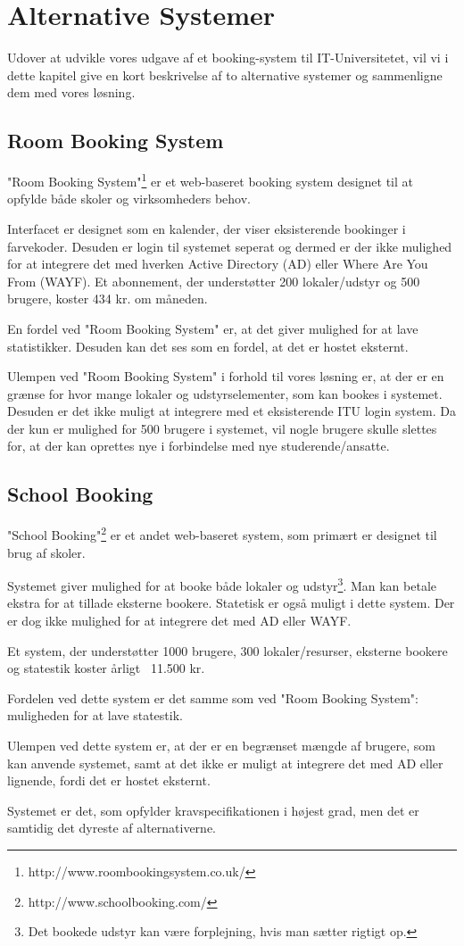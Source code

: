 \chapter{Alternative Systemer}
\label{Comparison}
Udover at udvikle vores udgave af et booking-system til IT-Universitetet, vil vi i dette kapitel give en kort beskrivelse af to alternative  systemer og sammenligne dem med vores løsning.

\section{Room Booking System}
\label{Comparison_RBS}
"Room Booking System"\footnote{http://www.roombookingsystem.co.uk/} er et web-baseret booking system designet til at opfylde både skoler og virksomheders behov. 

Interfacet er designet som en kalender, der viser eksisterende bookinger i farvekoder. Desuden er login til systemet seperat og dermed er der ikke mulighed for at integrere det med hverken Active Directory (AD) eller Where Are You From (WAYF). Et abonnement, der understøtter 200 lokaler/udstyr og 500 brugere, koster 434 kr. om måneden.

En fordel ved "Room Booking System" er, at det giver mulighed for at lave statistikker. Desuden kan det ses som en fordel, at det er hostet eksternt.

Ulempen ved "Room Booking System" i forhold til vores løsning er, at der er en grænse for hvor mange lokaler og udstyrselementer, som kan bookes i systemet. Desuden er det ikke muligt at integrere med et eksisterende ITU login system. Da der kun er mulighed for 500 brugere i systemet, vil nogle brugere skulle slettes for, at der kan oprettes nye i forbindelse med nye studerende/ansatte.

\section{School Booking}
\label{Comparison_SB}
"School Booking"\footnote{http://www.schoolbooking.com/} er et andet web-baseret system, som primært er designet til brug af skoler. 

Systemet giver mulighed for at booke både lokaler og udstyr\footnote{Det bookede udstyr kan være forplejning, hvis man sætter rigtigt op.}. Man kan betale ekstra for at tillade eksterne bookere. Statetisk er også muligt i dette system. Der er dog ikke mulighed for at integrere det med AD eller WAYF.

Et system, der understøtter 1000 brugere, 300 lokaler/resurser, eksterne bookere og statestik koster årligt ~11.500 kr.

Fordelen ved dette system er det samme som ved "Room Booking System": muligheden for at lave statestik.

Ulempen ved dette system er, at der er en begrænset mængde af brugere, som kan anvende systemet, samt at det ikke er muligt at integrere det med AD eller lignende, fordi det er hostet eksternt.

Systemet er det, som opfylder kravspecifikationen i højest grad, men det er samtidig det dyreste af alternativerne.